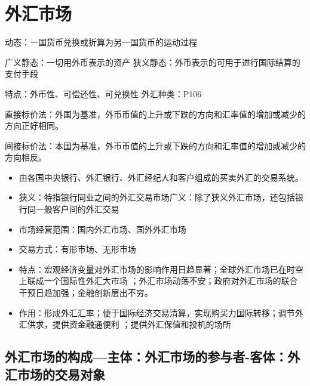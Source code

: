 \documentclass{article}
\begin{document}
\clearpage

\section*{\center\Huge 外汇市场}
动态：一国货币兑换或折算为另一国货币的运动过程

广义静态：一切用外币表示的资产\hspace*{25pt}
狭义静态：外币表示的可用于进行国际结算的支付手段

特点：外币性、可偿还性、可兑换性 \hspace*{25pt}外汇种类：P106

直接标价法：外国为基准，外币币值的上升或下跌的方向和汇率值的增加或减少的方向正好相同。

间接标价法：本国为基准，外币币值的上升或下跌的方向和汇率值的增加或减少的方向相反。
\begin{itemize}
    \item 由各国中央银行、外汇银行、外汇经纪人和客户组成的买卖外汇的交易系统。
    \item 狭义：特指银行同业之间的外汇交易市场\hspace*{25pt}广义：除了狭义外汇市场，还包括银行同一般客户间的外汇交易 
    \item 市场经营范围：国内外汇市场、国外外汇市场
    \item 交易方式：有形市场、无形市场
    \item 特点：宏观经济变量对外汇市场的影响作用日趋显著；全球外汇市场已在时空上联成一个国际性外汇大市场
    ；外汇市场动荡不安；政府对外汇市场的联合干预日趋加强；金融创新层出不穷。
    \item 作用：形成外汇汇率；便于国际经济交易清算，实现购买力国际转移；调节外汇供求，提供资金融通便利
    ；提供外汇保值和投机的场所
\end{itemize}
\subsection*{外汇市场的构成---主体：外汇市场的参与者-客体：外汇市场的交易对象}
\end{document}
